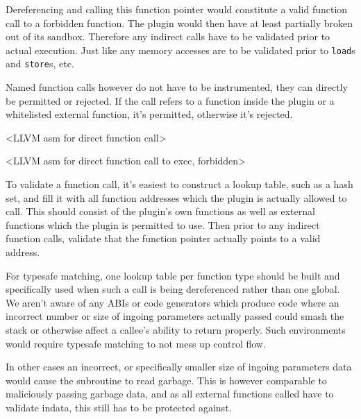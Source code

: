 Dereferencing and calling this function pointer would constitute a valid
function call to a forbidden function. The plugin would then have at least
partially broken out of its sandbox. Therefore any indirect calls have to be
validated prior to actual execution. Just like any memory accesses are to be
validated prior to \texttt{load}s and \texttt{store}s, etc.

Named function calls however do not have to be instrumented, they can directly
be permitted or rejected. If the call refers to a function inside the plugin or
a whitelisted external function, it's permitted, otherwise it's rejected.

<LLVM asm for direct function call>

<LLVM asm for direct function call to exec, forbidden>

To validate a function call, it's easiest to construct a lookup table, such as a
hash set, and fill it with all function addresses which the plugin is actually
allowed to call. This should consist of the plugin's own functions as well as
external functions which the plugin is permitted to use. Then prior to any
indirect function calls, validate that the function pointer actually points to a
valid address.

For typesafe matching, one lookup table per function type should be built and
specifically used when such a call is being dereferenced rather than one global.
We aren't aware of any ABIs or code generators which produce code where an
incorrect number or size of ingoing parameters actually passed could smash the
stack or otherwise affect a callee's ability to return properly. Such
environments would require typesafe matching to not mess up control flow.

In other cases an incorrect, or specifically smaller size of ingoing parameters
data would cause the subroutine to read garbage. This is however comparable to
maliciously passing garbage data, and as all external functions called have to
validate indata, this still has to be protected against.
